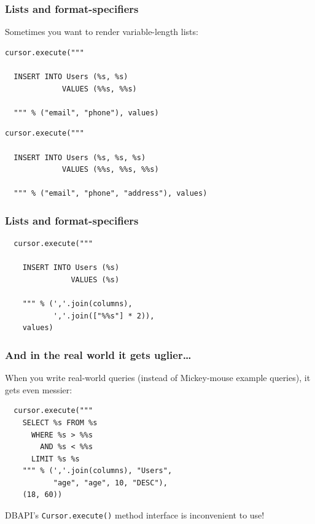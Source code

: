 \documentclass{beamer}
\begin{document}
\begin{frame}[fragile]
  \frametitle{Lists and format-specifiers}

  Sometimes you want to render variable-length lists:
\begin{verbatim}
cursor.execute("""

  INSERT INTO Users (%s, %s) 
             VALUES (%%s, %%s)

  """ % ("email", "phone"), values)
\end{verbatim}

\vfill\pause
\begin{verbatim}
cursor.execute("""

  INSERT INTO Users (%s, %s, %s) 
             VALUES (%%s, %%s, %%s)

  """ % ("email", "phone", "address"), values)
\end{verbatim}

\end{frame}


\begin{frame}[fragile]
  \frametitle{Lists and format-specifiers}
  
\begin{verbatim}
  cursor.execute("""
  
    INSERT INTO Users (%s) 
               VALUES (%s)
  
    """ % (','.join(columns),
           ','.join(["%%s"] * 2)), 
    values)
\end{verbatim}

\end{frame}


\begin{frame}[fragile]
  \frametitle{And in the real world it gets uglier\dots}

  When you write real-world queries (instead of Mickey-mouse example
  queries), it gets even messier:
\begin{verbatim}
  cursor.execute("""
    SELECT %s FROM %s 
      WHERE %s > %%s 
        AND %s < %%s 
      LIMIT %s %s
    """ % (','.join(columns), "Users",
           "age", "age", 10, "DESC"), 
    (18, 60))
\end{verbatim}

\vfill
DBAPI's \texttt{Cursor.execute()} method interface is inconvenient to use!

\end{frame}
\end{document}
